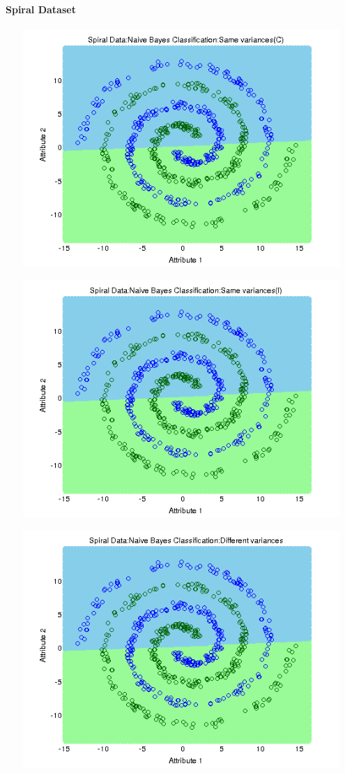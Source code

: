 \documentclass[a4paper]{article}
\begin{document}
		\paragraph{Spiral Dataset}
		
		\centerline{\includegraphics[width=160mm,height=90mm]{plots/naivebayes/nls/spiral/identity_var.png}}
		\centerline{\includegraphics[width=160mm,height=90mm]{plots/naivebayes/nls/spiral/same_var.png}}
		\centerline{\includegraphics[width=160mm,height=90mm]{plots/naivebayes/nls/spiral/diff_var.png}}
\end{document}
